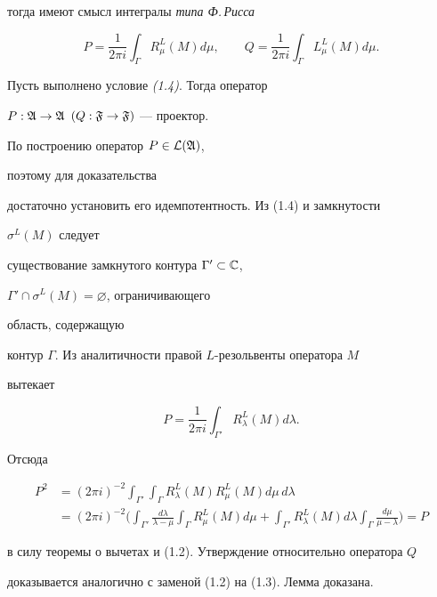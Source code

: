 тогда имеют смысл интегралы {\it типа Ф.\,Рисса} 


\begin{equation} 


P=\frac{1}{2\pi i}\int_\Gamma R^L_\mu(M)d\mu,\qquad 


Q=\frac{1}{2\pi i}\int_\Gamma L^L_\mu(M)d\mu. 


\end{equation} 


 


\begin{lemm} Пусть выполнено условие {\em (1.4)}. Тогда оператор 


$P:\frak A\to\frak A$ $(Q:\frak F\to\frak F)$ --- проектор. 


\end{lemm} 


 


\begin{pf} По построению оператор $P\in\cal L(\frak A)$, 


поэтому для доказательства 


достаточно установить его идемпотентность. Из (1.4) и замкнутости 


$\sigma^L(M)$ следует 


существование замкнутого контура $\Gamma'\subset\Bbb C$, 


$\Gamma'\cap\sigma^L(M)=\varnothing$, ограничивающего 


область, содержащую 


контур $\Gamma$. Из аналитичности правой $L$-резольвенты оператора $M$ 


вытекает 


$$ 


P=\frac{1}{2\pi i}\int_{\Gamma'}R^L_\lambda(M)d\lambda. 


$$ 


Отсюда 


\begin{align*} 


P^2 &=(2\pi i)^{-2}\int_{\Gamma'}\int_\Gamma R^L_\lambda(M)R^L_\mu(M) 


d\mu\,d\lambda\\ 


&=(2\pi i)^{-2}\biggl(\int_{\Gamma'}\frac{d\lambda}{\lambda-\mu} 


\int_\Gamma R^L_\mu(M)d\mu+\int_{\Gamma'}R^L_\lambda(M)d\lambda 


\int_\Gamma\frac{d\mu}{\mu-\lambda}\biggr)=P 


\end{align*} 


в силу теоремы о вычетах и (1.2). Утверждение относительно оператора $Q$ 


доказывается аналогично с заменой (1.2) на (1.3). Лемма доказана. 


\end{pf} 


